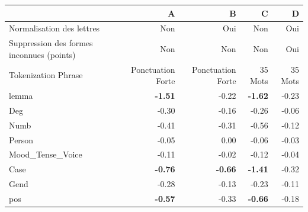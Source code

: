 \begin{table}[]
\begin{tabular}{l|rrrr}
\hline
                                          & A                 & B                 & C              & D              \\ \hline
Normalisation des lettres                 & Non               & Oui               & Non            & Oui            \\
Suppression des formes inconnues (points) & Non               & Non               & Non            & Oui            \\
Tokenization Phrase                       & Ponctuation Forte & Ponctuation Forte & 35 Mots        & 35 Mots        \\ \hline
lemma              & \textbf{-1.51} & -0.22          & \textbf{-1.62} & -0.23 \\
Deg                & -0.30          & -0.16          & -0.26          & -0.06 \\
Numb               & -0.41          & -0.31          & -0.56          & -0.12 \\
Person             & -0.05          & 0.00           & -0.06          & -0.03 \\
Mood\_Tense\_Voice & -0.11          & -0.02          & -0.12          & -0.04 \\
Case               & \textbf{-0.76} & \textbf{-0.66} & \textbf{-1.41} & -0.32 \\
Gend               & -0.28          & -0.13          & -0.23          & -0.11 \\
pos                & \textbf{-0.57} & -0.33          & \textbf{-0.66} & -0.18 \\ \hline
\end{tabular}
\end{table}